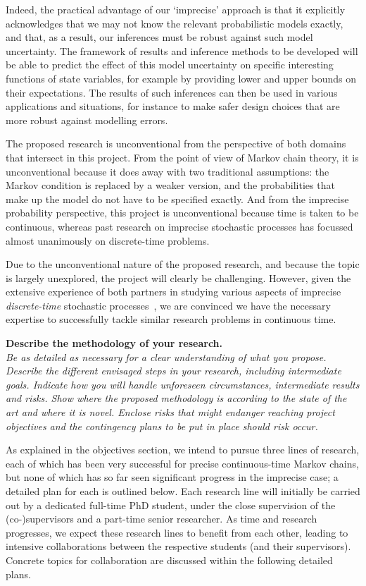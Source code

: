 \documentclass[11pt,dvipsnames,usenames,a4paper]{article}
\begin{document}
Indeed, the practical advantage of our `imprecise' approach is that it explicitly acknowledges that we may not know the relevant probabilistic models exactly, and that, as a result, our inferences must be robust against such model uncertainty. 
The framework of results and inference methods to be developed will be able to predict the effect of this model uncertainty on specific interesting functions of state variables, for example by providing lower and upper bounds on their expectations. 
The results of such inferences can then be used in various applications and situations, for instance to make safer design choices that are more robust against modelling errors.

The proposed research is unconventional from the perspective of both domains that intersect in this project.
From the point of view of Markov chain theory, it is unconventional because it does away with two traditional assumptions: the Markov condition is replaced by a weaker version, and the probabilities that make up the model do not have to be specified exactly. 
And from the imprecise probability perspective, this project is unconventional because time is taken to be continuous, whereas past research on imprecise stochastic processes has focussed almost unanimously on discrete-time problems.

Due to the unconventional nature of the proposed research, and because the topic is largely unexplored, the project will clearly be challenging. 
However, given the extensive experience of both partners in studying various aspects of imprecise \emph{discrete-time} stochastic processes~\cite{cooman2007d,cooman2008,hermans2012,cooman2015:markovergodic}, we are convinced we have the necessary expertise to successfully tackle similar research problems in continuous time.


\vspace{7pt}

\textbf{Describe the methodology of your research.}\\
\textit{Be as detailed as necessary for a clear understanding of what you propose.
Describe the different envisaged steps in your research, including intermediate goals. Indicate how you will handle unforeseen circumstances, intermediate results and risks.
Show where the proposed methodology is according to the state of the art and where it is novel.
Enclose risks that might endanger reaching project objectives and the contingency plans to be put in place should risk occur.}

As explained in the objectives section, we intend to pursue three lines of research, each of which has been very successful for precise continuous-time Markov chains, but none of which has so far seen significant progress in the imprecise case; a detailed plan for each is outlined below. 
Each research line will initially be carried out by a dedicated full-time PhD student, under the close supervision of the (co-)supervisors and a part-time senior researcher. 
As time and research progresses, we expect these research lines to benefit from each other, leading to intensive collaborations between the respective students (and their supervisors). Concrete topics for collaboration are discussed within the following detailed plans.
\end{document}
